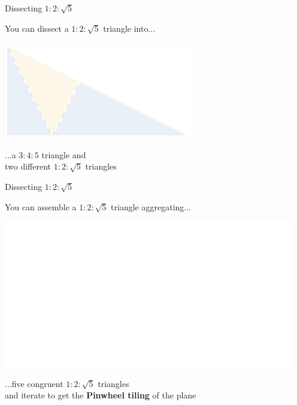 \documentclass[14pt]{beamer}
\begin{document}

    \begin{frame}{Dissecting $1\!\!:\!\!2\!\!:\!\!\sqrt{5}$}
        \begin{center}
            You can dissect a $1\!\!:\!\!2\!\!:\!\!\sqrt{5}$ triangle into...

            \bigskip \bigskip

            \includegraphics[height=18ex]{figures/figure006i.pdf}

            \bigskip \bigskip

            ...a $3\!\!:\!\!4\!\!:\!\!5$ triangle and\\two different $1\!\!:\!\!2\!\!:\!\!\sqrt{5}$ triangles
        \end{center}
    \end{frame}


    \begin{frame}{Dissecting $1\!\!:\!\!2\!\!:\!\!\sqrt{5}$}
        \begin{center}
            You can assemble a $1\!\!:\!\!2\!\!:\!\!\sqrt{5}$ triangle aggregating...

            \bigskip \bigskip

            \includegraphics[height=18ex]{figures/figure006g.pdf}

            \bigskip \bigskip

            ...five congruent $1\!\!:\!\!2\!\!:\!\!\sqrt{5}$ triangles\\and iterate to get the \textbf{Pinwheel tiling} of the plane
        \end{center}
    \end{frame}
\end{document}
